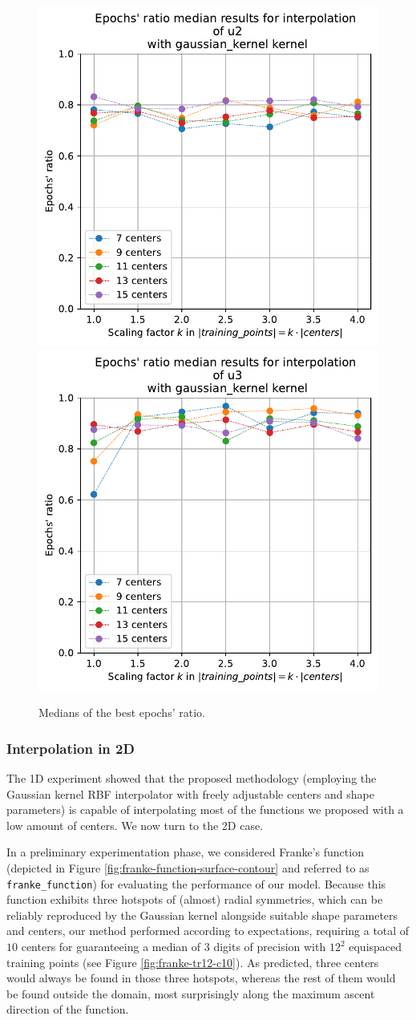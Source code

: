 \documentclass[12pt]{report} %
\begin{document}
\begin{figure}[H]
  {\includegraphics[height=.45\textwidth]
  {imagenes/experiments/1d/statistical_1d_full/u2/medians_epochs_u2_gaussian_kernel.pdf}}
  {\includegraphics[height=.45\textwidth]
  {imagenes/experiments/1d/statistical_1d_full/u3/medians_epochs_u3_gaussian_kernel.pdf}}
  \caption{Medians of the best epochs' ratio.}
  \label{fig:medians-epochs-statistic-u2-u3}
\end{figure}

\clearpage

\subsubsection*{Interpolation in 2D}

The 1D experiment showed that the proposed methodology (employing the Gaussian
kernel RBF interpolator with freely adjustable centers and shape parameters) is
capable of interpolating most of the functions we proposed with a low amount of
centers. We now turn to the 2D case.

In a preliminary experimentation phase, we considered Franke's function (depicted in Figure \ref{fig:franke-function-surface-contour} and referred to as \texttt{franke\_function}) for evaluating the performance of our model. Because this function exhibits three hotspots of (almost) radial symmetries, which can be reliably reproduced by the Gaussian kernel alongside suitable shape parameters and centers, our method performed according to expectations, requiring a total of $10$ centers for guaranteeing a median of $3$ digits of precision with $12^2$ equispaced training points (see Figure \ref{fig:franke-tr12-c10}). As predicted, three centers would always be found in those three hotspots, whereas the rest of them would be found outside the domain, most surprisingly along the maximum ascent direction of the function.
\end{document}
